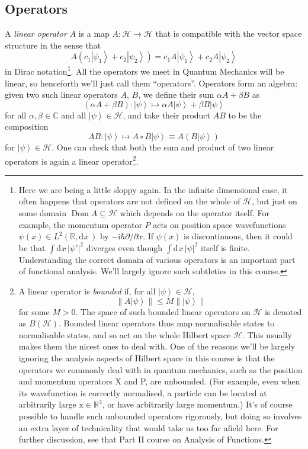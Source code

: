 \documentclass{article}
\theoremstyle{plain}\theoremheaderfont{\normalfont\itshape}\theorembodyfont{\rmfamily}\theoremseparator{.}\newtheorem*{rem}{Remark}\newtheorem*{ex}{Example}\newtheorem*{proof}{Proof}\newtheorem*{altp}{Alternative proof}
\theoremstyle{plain}\theoremheaderfont{\normalfont\bfseries}\theorembodyfont{\rmfamily}\theoremseparator{.}\newtheorem{thm}{Theorem}[section]\newtheorem{lem}[thm]{Lemma}\newtheorem{prop}[thm]{Proposition}\newtheorem*{cor}{Corollary}\newtheorem{defn}[thm]{Definition}\newtheorem{clm}[thm]{Claim}\newtheorem{clminproof}{Claim}
\theoremstyle{break}\theoremheaderfont{\normalfont\itshape}\theorembodyfont{\rmfamily}\theoremseparator{.\medskip}\newtheorem*{proofskip}{Proof}\newtheorem*{exs}{Examples}\newtheorem*{rems}{Remarks}
\theoremstyle{break}\theoremheaderfont{\normalfont\bfseries}\theorembodyfont{\rmfamily}\theoremseparator{.\medskip}\newtheorem{lemskip}[thm]{Lemma}\newtheorem{defnskip}[thm]{Definition}\newtheorem{propskip}[thm]{Proposition}\newtheorem{thmskip}[thm]{Theorem}
\numberwithin{equation}{section}
\newcommand{\ii}{\mathrm{i}}
\newcommand{\dd}[2][]{\mathrm{d}^{#1} #2\,}
\newcommand{\ket}[1]{\left| #1 \right\rangle}
\newcommand{\vb}[1]{\bm{\mathrm{#1}}}
\newcommand{\abs}[1]{\left| #1 \right|}
\newcommand{\norm}[1]{\left\| #1 \right\|}
\newcommand{\hb}{\mathcal{H}}
\DeclareMathOperator{\Dom}{Dom}
\newcommand{\RR}{\mathbb{R}}
\newcommand{\CC}{\mathbb{C}}
\begin{document}
    \subsection{Operators}
    A \textit{linear operator} \(A\) is a map \(A:\hb\to\hb\) that is compatible with the vector space structure in the sense that
    \begin{equation}
        A(c_1\ket{\psi_1}+c_2\ket{\psi_2})=c_1A\ket{\psi_1}+c_2A\ket{\psi_2}
    \end{equation}
    in Dirac notation\footnote{Here we are being a little sloppy again. In the infinite dimensional case, it often happens that operators are not defined on the whole of \(\hb\), but just on some domain \(\Dom A\subseteq\hb\) which depends on the operator itself. For example, the momentum operator \(P\) acts on position space wavefunctions \(\psi(x)\in L^2(\RR,\dd{x})\) by \(-\ii\hbar\partial/\partial x\). If \(\psi(x)\) is discontinuous, then it could be that \(\int\dd{x}\abs{\psi'}^2\) diverges even though \(\int\dd{x}\abs{\psi}^2\) itself is finite. Understanding the correct domain of various operators is an important part of functional analysis. We'll largely ignore such subtleties in this course.}. All the operators we meet in Quantum Mechanics will be linear, so henceforth we'll just call them ``operators''. Operators form an algebra: given two such linear operators \(A\), \(B\), we define their sum \(\alpha A+\beta B\) as
    \begin{equation}
        (\alpha A+\beta B):\ket{\psi}\mapsto \alpha A\ket{\psi}+\beta B\ket{\psi}
    \end{equation}
    for all \(\alpha,\beta\in\CC\) and all \(\ket{\psi}\in\hb\), and take their product \(AB\) to be the composition
    \begin{equation}
        AB:\ket{\psi}\mapsto A\circ B\ket{\psi}\equiv A(B\ket{\psi})
    \end{equation}
    for \(\ket{\psi}\in\hb\). One can check that both the sum and product of two linear operators is
    again a linear operator\footnote{A linear operator is \textit{bounded} if, for all \(\ket{\psi}\in\hb\),
    \begin{equation}
        \norm{A\ket{\psi}}\le M\norm{\ket{\psi}}
    \end{equation}
    for some \(M>0\). The space of such bounded linear operators on \(\hb\) is denoted as \(B(\hb)\). Bounded linear operators thus map normalisable states to normalisable states, and so act on the whole Hilbert space \(\hb\). This usually makes them the nicest ones to deal with. One of the reasons we'll be largely ignoring the analysis aspects of Hilbert space in this course is that the operators we commonly deal with in quantum mechanics, such as the position and momentum operators X and P, are unbounded. (For example, even when its wavefunction is correctly normalised, a particle can be located at arbitrarily large \(\vb{x}\in\RR^3\), or have arbitrarily large momentum.) It's of course possible to handle such unbounded operators rigorously, but doing so involves an extra layer of technicality that would take us too far afield here. For further discussion, see that Part II course on Analysis of Functions.}.
\end{document}
